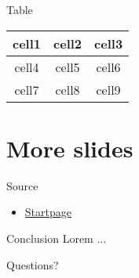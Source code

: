 \documentclass{beamer}
\begin{document}
    \begin{frame}{Table}
        \begin{center}
        \begin{tabular}{ |c|c|c| } 
        \hline
        \textbf{cell1} & \textbf{cell2} & \textbf{cell3} \\ \hline
        cell4 & \alert{cell5} & cell6 \\ \hline
        cell7 & cell8 & cell9 \\ \hline
        \end{tabular}
        \end{center}
    \end{frame}

\section{More slides}

    \begin{frame}{Source}
        \begin{itemize}
        \item \href{https://www.startpage.com/}{Startpage}
        \end{itemize}
    \end{frame}

    \begin{frame}{Conclusion}
        Lorem ...
    \end{frame}

    {
    \begin{frame}[standout]
    Questions?
    \end{frame}
    }
\end{document}
